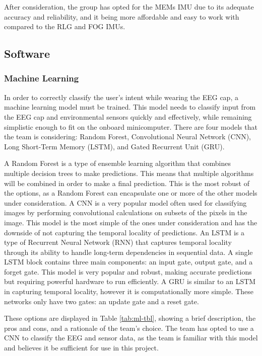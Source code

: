 \documentclass[conference]{IEEEtran}
\begin{document}
            After consideration, the group has opted for the MEMs IMU due to its adequate accuracy and reliability, and it being more affordable and easy to work with compared to the RLG and FOG IMUs.

        \subsection{ {Software}}
            \subsubsection{Machine Learning}
            In order to correctly classify the user's intent while wearing the EEG cap, a machine learning model must be trained. This model needs to classify input from the EEG cap and environmental sensors quickly and effectively, while remaining simplistic enough to fit on the onboard minicomputer. There are four models that the team is considering: Random Forest, Convolutional Neural Network (CNN), Long Short-Term Memory (LSTM), and Gated Recurrent Unit (GRU). 
            
            A Random Forest is a type of ensemble learning algorithm that combines multiple decision trees to make predictions. This means that multiple algorithms will be combined in order to make a final prediction. This is the most robust of the options, as a Random Forest can encapsulate one or more of the other models under consideration. A CNN is a very popular model often used for classifying images by performing convolutional calculations on subsets of the pixels in the image. This model is the most simple of the ones under consideration and has the downside of not capturing the temporal locality of predictions. An LSTM is a type of Recurrent Neural Network (RNN) that captures temporal locality through its ability to handle long-term dependencies in sequential data. A single LSTM block contains three main components: an input gate, output gate, and a forget gate. This model is very popular and robust, making accurate predictions but requiring powerful hardware to run efficiently. A GRU is similar to an LSTM in capturing temporal locality, however it is computationally more simple. These networks only have two gates: an update gate and a reset gate. 
            
            These options are displayed in Table \ref{tab:ml-tbl}, showing a brief description, the pros and cons, and a rationale of the team's choice. The team has opted to use a CNN to classify the EEG and sensor data, as the team is familiar with this model and believes it be sufficient for use in this project.
        \onecolumn
        \renewcommand{\arraystretch}{3}
        \setlength{\arrayrulewidth}{1.5pt}
\end{document}
